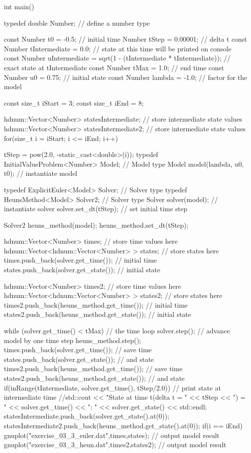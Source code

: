 \documentclass[10pt,oneside,a4paper]{scrartcl}
\begin{document}
    \begin{cppcode}
int main() {
  typedef double Number;                    // define a number type

  const Number t0             = -0.5;       // initial time
        Number tStep          = 0.00001;    // delta t
  const Number tIntermediate  = 0.0;        // state at this time will be printed on console
  const Number uIntermediate  = sqrt(1 - (tIntermediate * tIntermediate)); // exact state at tIntermediate
  const Number tMax           = 1.0;        // end time
  const Number u0             = 0.75;       // initial state
  const Number lambda         = -1.0;     // factor for the model

  const size_t iStart         = 3;
  const size_t iEnd           = 8;

  hdnum::Vector<Number> statesIntermediate;     // store intermediate state values
  hdnum::Vector<Number> statesIntermediate2;     // store intermediate state values
  for(size_t i = iStart; i <= iEnd; i++) {
    tStep = pow(2.0, -static_cast<double>(i));
    typedef InitialValueProblem<Number> Model;  // Model type
    Model model(lambda, u0, t0);                // instantiate model

    typedef ExplicitEuler<Model> Solver;        // Solver type
    typedef HeunsMethod<Model> Solver2;        // Solver type
    Solver solver(model);                       // instantiate solver
    solver.set_dt(tStep);                       // set initial time step

    Solver2 heuns_method(model);
    heuns_method.set_dt(tStep);

    hdnum::Vector<Number> times;                // store time values here
    hdnum::Vector<hdnum::Vector<Number> > states;   // store states here
    times.push_back(solver.get_time());       // initial time
    states.push_back(solver.get_state());       // initial state

    hdnum::Vector<Number> times2;                // store time values here
    hdnum::Vector<hdnum::Vector<Number> > states2;   // store states here
    times2.push_back(heuns_method.get_time());       // initial time
    states2.push_back(heuns_method.get_state());       // initial state

    while (solver.get_time() < tMax)         // the time loop
    {
      solver.step();                          // advance model by one time step
      heuns_method.step();
      times.push_back(solver.get_time());       // save time
      states.push_back(solver.get_state());     // and state
      times2.push_back(heuns_method.get_time());       // save time
      states2.push_back(heuns_method.get_state());     // and state
      if(inRange(tIntermediate, solver.get_time(), tStep/2.0)) {    // print state at intermediate time
        //std::cout << "State at time t(delta t = " << tStep << ") = " << solver.get_time() << ": " << solver.get_state() << std::endl;
        statesIntermediate.push_back(solver.get_state().at(0));
        statesIntermediate2.push_back(heuns_method.get_state().at(0));
      }
    }
    if(i == iEnd) {
      gnuplot("exercise_03_3_euler.dat",times,states);    // output model result
      gnuplot("exercise_03_3_heun.dat",times2,states2);    // output model result
    }
  }

}
\end{cppcode}
\end{document}
